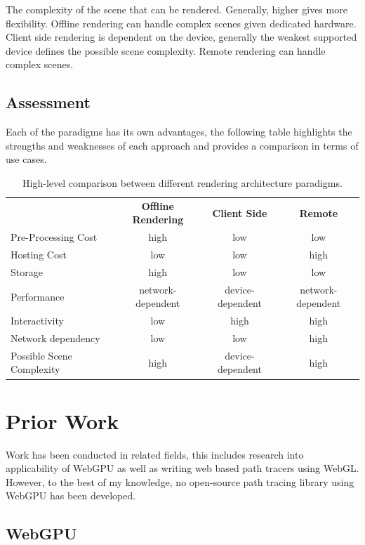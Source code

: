 The complexity of the scene that can be rendered. Generally, higher gives more flexibility. Offline rendering can handle complex scenes given dedicated hardware. Client side rendering is dependent on the device, generally the weakest supported device defines the possible scene complexity. Remote rendering can handle complex scenes.

\subsection*{Assessment}

Each of the paradigms has its own advantages, the following table highlights the strengths and weaknesses of each approach and provides a comparison in terms of use cases.

\begin{table}[H]\centering
  \begin{tabular}{@{}lccc@{}}\toprule
   & \bfseries Offline Rendering & \bfseries Client Side & \bfseries Remote \\
  Pre-Processing Cost & high & low & low \\
  Hosting Cost & low & low & high \\
  Storage & high & low & low \\
  Performance & network-dependent & device-dependent & network-dependent \\
  Interactivity & low & high & high \\
  Network dependency & low & low & high \\
  Possible Scene Complexity & high & device-dependent & high \\
  \bottomrule
  \end{tabular}
  \caption{High-level comparison between different rendering architecture paradigms.}
\end{table}

\section{Prior Work}

Work has been conducted in related fields, this includes research into applicability of WebGPU as well as writing web based path tracers using WebGL. However, to the best of my knowledge, no open-source path tracing library using WebGPU has been developed.

\subsection*{WebGPU}

